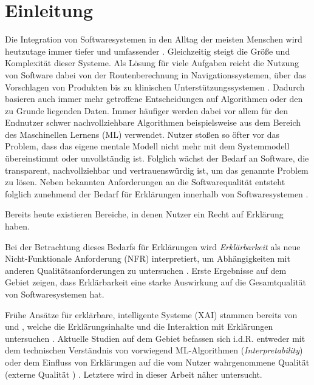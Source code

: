 \chapter{Einleitung}

Die Integration von Softwaresystemen in den Alltag der meisten Menschen wird heutzutage immer tiefer und umfassender \cite{carvalho2020developers}.  Gleichzeitig steigt die Größe und Komplexität dieser Systeme. Als Lösung für viele Aufgaben reicht die Nutzung von Software dabei von der Routenberechnung in Navigationssystemen, über das Vorschlagen von Produkten bis zu klinischen Unterstützungssystemen \cite{chazette2020explainability, tintarev2015explaining, cypko2017guide}. Dadurch basieren auch immer mehr getroffene Entscheidungen auf Algorithmen oder den zu Grunde liegenden Daten. Immer häufiger werden dabei vor allem für den Endnutzer schwer nachvollziehbare Algorithmen beispielsweise aus dem Bereich des Maschinellen Lernens (ML) verwendet. Nutzer stoßen so öfter vor das Problem, dass das eigene mentale Modell nicht mehr mit dem Systemmodell übereinstimmt oder unvollständig ist. Folglich wächst der Bedarf an Software, die transparent, nachvollziehbar und vertrauenswürdig ist, um das genannte Problem zu lösen. Neben bekannten Anforderungen an die Softwarequalität \cite{international2011iso} entsteht folglich zunehmend der Bedarf für Erklärungen innerhalb von Softwaresystemen \cite{chazette_end-users_nodate}.

Bereits heute existieren Bereiche, in denen Nutzer ein \glqq Recht auf Erklärung\grqq{} haben.

Bei der Betrachtung dieses Bedarfs für Erklärungen wird \textit{Erklärbarkeit} als neue Nicht-Funktionale Anforderung (NFR) interpretiert, um Abhängigkeiten mit anderen Qualitätsanforderungen zu untersuchen \cite{chazette2020explainability, kohl_explainability_2019}. Erste Ergebnisse auf dem Gebiet zeigen, dass Erklärbarkeit eine starke Auswirkung auf die Gesamtqualität von Softwaresystemen hat.

Frühe Ansätze für erklärbare, intelligente Systeme (XAI) stammen bereits von \citeauthor{byrne1991construction} und \citeauthor{cawsey1991generating}, welche die Erklärungsinhalte \cite{byrne1991construction} und die Interaktion mit Erklärungen untersuchen \cite{cawsey1991generating}. Aktuelle Studien auf dem Gebiet befassen sich i.d.R. entweder mit dem technischen Verständnis von vorwiegend ML-Algorithmen (\textit{Interpretability}) \cite{gilpin_explaining_2018, fong_interpretable_2017, samek_towards_2019} oder dem Einfluss von Erklärungen auf die vom Nutzer wahrgenommene Qualität (externe Qualität \cite{international2011iso}) \cite{nunes_systematic_2017,kouki_user_2017,chazette_end-users_nodate}. Letztere wird in dieser Arbeit näher untersucht.

